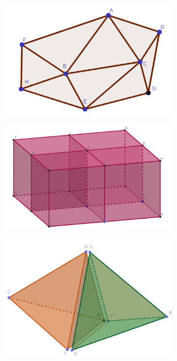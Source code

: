 \begin{figure}[th]
\centering
\begin{subfigure}{.3\textwidth}
  \centering
  \includegraphics[scale=0.3]{Images/planar_graph}
  \caption{}
\end{subfigure}%
\begin{subfigure}{.3\textwidth}
  \centering
  \includegraphics[scale=0.18]{Images/4cubes}
  \caption{}
\end{subfigure}
\begin{subfigure}{.3\textwidth}
  \centering
  \includegraphics[scale=0.2]{Images/naive}

\end{subfigure}
\end{figure}
